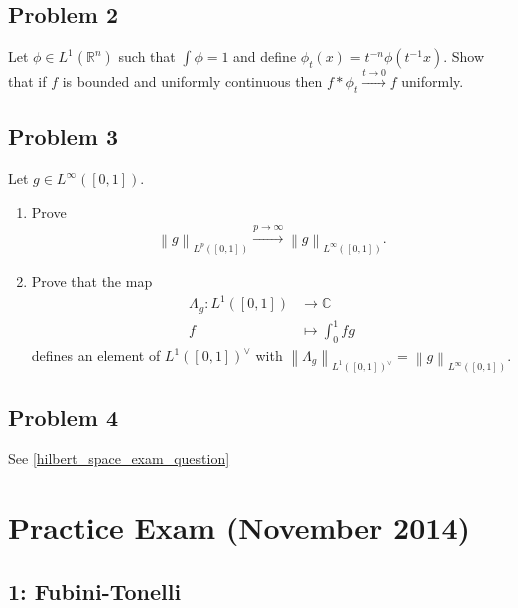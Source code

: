 \hypertarget{problem-2-1}{%
\subsection{Problem 2}\label{problem-2-1}}

Let \(\phi\in L^1({\mathbb{R}}^n)\) such that \(\int \phi = 1\) and
define \(\phi_t(x) = t^{-n}\phi(t^{-1}x)\). Show that if \(f\) is
bounded and uniformly continuous then
\(f\ast \phi_t \overset{t\to 0}\to f\) uniformly.

\hypertarget{problem-3-1}{%
\subsection{Problem 3}\label{problem-3-1}}

Let \(g\in L^\infty([0, 1])\).

\begin{enumerate}
\def\labelenumi{\alph{enumi}.}
\item
  Prove
  \begin{align*}
  {\left\lVert {g} \right\rVert}_{L^p([0, 1])}  \overset{p\to\infty}\to {\left\lVert {g} \right\rVert}_{L^\infty([0, 1])}
  .\end{align*}
\item
  Prove that the map
  \begin{align*}
  \Lambda_g: L^1([0, 1]) &\to {\mathbb{C}}\\
  f &\mapsto \int_0^1 fg
  \end{align*}
  defines an element of \(L^1([0, 1])^\vee\) with
  \({\left\lVert {\Lambda_g} \right\rVert}_{L^1([0, 1])^\vee}= {\left\lVert {g} \right\rVert}_{L^\infty([0, 1])}\).
\end{enumerate}

\hypertarget{problem-4-1}{%
\subsection{Problem 4}\label{problem-4-1}}

See \cref{hilbert_space_exam_question}

\hypertarget{practice-exam-november-2014}{%
\section{Practice Exam (November
2014)}\label{practice-exam-november-2014}}

\hypertarget{fubini-tonelli}{%
\subsection{1: Fubini-Tonelli}\label{fubini-tonelli}}

